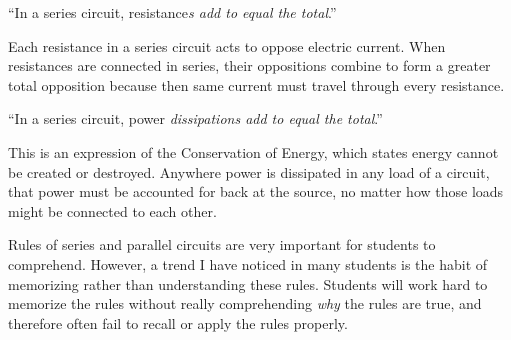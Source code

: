\noindent
``In a series circuit, resistance{\it s add to equal the total}.''

\vskip 10pt

Each resistance in a series circuit acts to oppose electric current.  When resistances are connected in series, their oppositions combine to form a greater total opposition because then same current must travel through every resistance.



\vskip 30pt

\noindent
``In a series circuit, power {\it dissipations add to equal the total}.''

\vskip 10pt

This is an expression of the Conservation of Energy, which states energy cannot be created or destroyed.  Anywhere power is dissipated in any load of a circuit, that power must be accounted for back at the source, no matter how those loads might be connected to each other.







Rules of series and parallel circuits are very important for students to comprehend.  However, a trend I have noticed in many students is the habit of memorizing rather than understanding these rules.  Students will work hard to memorize the rules without really comprehending {\it why} the rules are true, and therefore often fail to recall or apply the rules properly.




